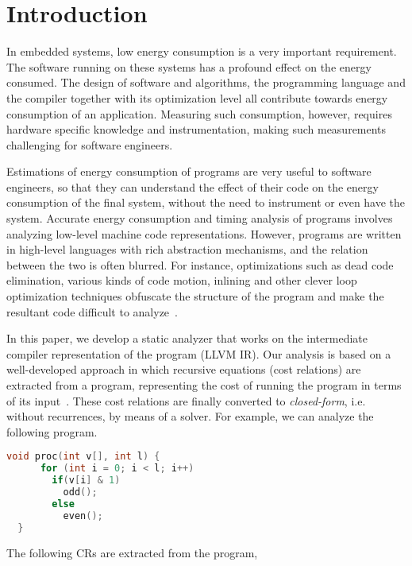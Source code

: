 \documentclass[9pt,preprint]{sigplanconf}
\begin{document}
\section{Introduction}
\label{sec:introduction}

In embedded systems, low energy consumption is a very important
requirement. The software running on these systems has a profound effect on the
energy consumed. The design of software and algorithms, the programming
language and the compiler together with its optimization level all contribute
towards energy consumption of an application. Measuring such consumption,
however, requires hardware specific knowledge and instrumentation, making
such measurements challenging for software engineers.

Estimations of energy consumption of
programs are very useful to software engineers, so that they can understand the effect
of their code on the energy consumption of the final system, without the
need to instrument or even have the system. Accurate energy
consumption and timing analysis of programs involves analyzing low-level machine
code representations. However, programs are written in
high-level languages with rich abstraction mechanisms, and the relation between
the two is often blurred. For instance, optimizations such as dead code
elimination, various kinds of code motion, inlining and other clever loop
optimization techniques obfuscate the structure of the program and make the
resultant code difficult to analyze~\cite{Tice1998}.

In this paper, we develop a static analyzer that works on the intermediate
compiler representation of the program (LLVM IR). Our analysis is based on a
well-developed approach in which recursive equations (cost relations) are
extracted from a program, representing the cost of running the program in terms
of its input~\cite{DBLP:journals/cacm/Wegbreit75,
  Rosendahl89,AlbertAGP11a,Albert:2009:CRS:1594413.1594567}.
These cost relations are finally
converted to \emph{closed-form}, i.e. without recurrences, by means of a
solver. For example, we can analyze the following program.

{
\nocaptionrule
\begin{lstlisting}[language=C]
  void proc(int v[], int l) {
      for (int i = 0; i < l; i++)
        if(v[i] & 1)
          odd();
        else
          even();
  }
\end{lstlisting}
}

\noindent The following CRs are extracted from the program,
\end{document}
